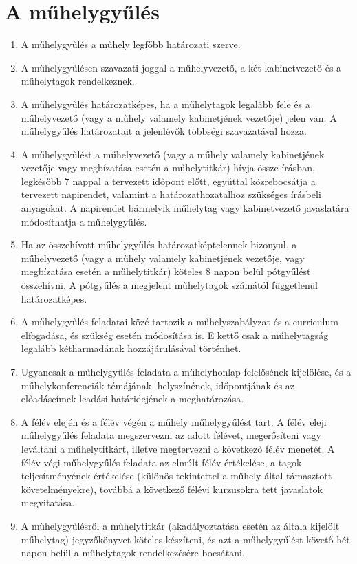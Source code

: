\documentclass{../styles/rulebook}
\begin{document}
\section{A műhelygyűlés}

\begin{enumerate}
	\item A műhelygyűlés a műhely legfőbb határozati szerve.
	\item A műhelygyűlésen szavazati joggal a műhelyvezető, a két kabinetvezető és a műhelytagok rendelkeznek.
	\item A műhelygyűlés határozatképes, ha a műhelytagok legalább fele és a műhelyvezető (vagy a műhely valamely kabinetjének vezetője) jelen van. A műhelygyűlés határozatait a jelenlévők többségi szavazatával hozza.
	\item A műhelygyűlést a műhelyvezető (vagy a műhely valamely kabinetjének vezetője vagy megbízatása esetén a műhelytitkár) hívja össze írásban, legkésőbb 7 nappal a tervezett időpont előtt, egyúttal közrebocsátja a tervezett napirendet, valamint a határozathozatalhoz szükséges	írásbeli anyagokat. A napirendet bármelyik műhelytag vagy kabinetvezető javaslatára módosíthatja a műhelygyűlés.
	\item Ha az összehívott műhelygyűlés határozatképtelennek bizonyul, a műhelyvezető (vagy a műhely valamely kabinetjének vezetője, vagy megbízatása esetén a műhelytitkár) köteles 8 napon belül pótgyűlést összehívni. A pótgyűlés a megjelent műhelytagok számától függetlenül határozatképes.
	\item A műhelygyűlés feladatai közé tartozik a műhelyszabályzat és a curriculum elfogadása, és szükség esetén módosítása is. E kettő csak a műhelytagság legalább kétharmadának hozzájárulásával történhet.
	\item Ugyancsak a műhelygyűlés feladata a műhelyhonlap felelősének kijelölése, és a műhelykonferenciák témájának, helyszínének, időpontjának és az előadáscímek leadási határidejének a meghatározása.
	\item A félév elején és a félév végén a műhely műhelygyűlést tart. A félév eleji műhelygyűlés feladata megszervezni az adott félévet, megerősíteni vagy leváltani a műhelytitkárt, illetve megtervezni a következő félév menetét. A félév végi műhelygyűlés feladata az elmúlt félév értékelése, a tagok teljesítményének értékelése (különös tekintettel a műhely által támasztott követelményekre), továbbá a következő félévi kurzusokra tett javaslatok megvitatása.
	\item A műhelygyűlésről a műhelytitkár (akadályoztatása esetén az általa kijelölt műhelytag) jegyzőkönyvet köteles készíteni, és azt a műhelygyűlést követő hét napon belül a műhelytagok rendelkezésére bocsátani.
\end{enumerate}
\end{document}
